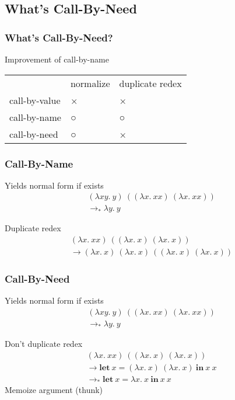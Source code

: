 \documentclass[dvipdfmx,cjk,xcolor=dvipsnames,envcountsect,notheorems,12pt]{beamer}
\theoremstyle{definition}
\newcommand{\keyword}[1]{\mathbf{#1}}
\newcommand{\LET}{\keyword{let}}
\newcommand{\IN}{\keyword{in}}
\begin{document}
\subsection{What's Call-By-Need}

\begin{frame}
	\frametitle{What's Call-By-Need?}
	\Large
	Improvement of call-by-name

	\begin{center}
		\large
		\begin{tabular}{lll}
			& normalize & duplicate redex \\
			call-by-value & × & × \\
			call-by-name & ○ & ○ \\
			call-by-need & ○ & × \\
		\end{tabular}
	\end{center}
\end{frame}

\begin{frame}
	\frametitle{Call-By-Name}
	\Large
	Yields normal form if exists
	\[\begin{array}{l}
		(\lambda xy.~y)~((\lambda x.~xx)~(\lambda x.~xx)) \\
		\longrightarrow_* \lambda y.~y
	\end{array}\]

	\vfill

	Duplicate redex
	\[\begin{array}{l}
		(\lambda x.~xx)~((\lambda x.~x)~(\lambda x.~x)) \\
		\longrightarrow (\lambda x.~x)~(\lambda x.~x)~((\lambda x.~x)~(\lambda x.~x))
	\end{array}\]
\end{frame}

\begin{frame}
	\frametitle{Call-By-Need}
	\Large
	Yields normal form if exists
	\[\begin{array}{l}
		(\lambda xy.~y)~((\lambda x.~xx)~(\lambda x.~xx)) \\
		\longrightarrow_* \lambda y.~y
	\end{array}\]

	\vfill

	Don't duplicate redex
	\[\begin{array}{l}
		(\lambda x.~xx)~((\lambda x.~x)~(\lambda x.~x)) \\
		\longrightarrow \LET~x=(\lambda x.~x)~(\lambda x.~x)~\IN~x~x \\
		\longrightarrow_* \LET~x=\lambda x.~x~\IN~x~x

	\end{array}\]
	Memoize argument (thunk)
\end{frame}
\end{document}
